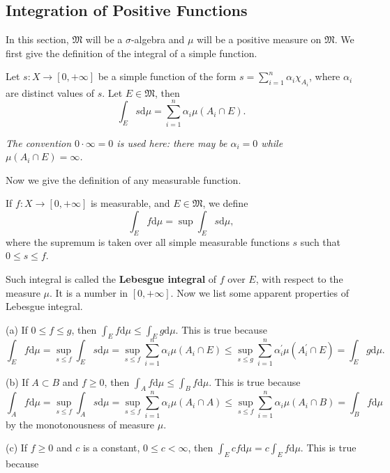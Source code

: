 \subsection{Integration of Positive Functions}
In this section, $\mathfrak{M}$ will be a $\sigma$-algebra and $\mu$ will be a positive measure on $\mathfrak{M}$. We first give the definition of the integral of a simple function.
\begin{definition}
Let $s:X\to[0,+\infty]$ be a simple function of the form $s=\sum_{i=1}^n\alpha_i\chi_{A_i}$, where $\alpha_i$ are distinct values of $s$. Let $E\in\mathfrak{M}$, then 
$$\int_Es\mathrm{d}\mu=\sum_{i=1}^n\alpha_i\mu(A_i\cap E).$$
\end{definition}
\begin{note}\em
The convention $0\cdot\infty=0$ is used here: there may be $\alpha_i=0$ while $\mu(A_i\cap E)=\infty$.
\end{note}
Now we give the definition of any measurable function.
\begin{definition}
If $f:X\to[0,+\infty]$ is measurable, and $E\in\mathfrak{M}$, we define 
$$\int_Ef\mathrm{d}\mu=\sup\int_Es\mathrm{d}\mu,$$
where the supremum is taken over all simple measurable functions $s$ such that $0\le s\le f$.
\end{definition}
Such integral is called the \textbf{Lebesgue integral} of $f$ over $E$, with respect to the measure $\mu$. It is a number in $[0,+\infty]$. Now we list some apparent properties of Lebesgue integral.\par
(a) If $0\le f\le g$, then $\int_Ef\mathrm{d}\mu\le\int_Eg\mathrm{d}\mu$. This is true because 
$$
\int_E{f\mathrm{d}\mu}=\mathop {\mathrm{sup}} \limits_{s\le f}\int_E{s\mathrm{d}\mu}=\mathop {\mathrm{sup}} \limits_{s\le f}\sum_{i=1}^n{\alpha _i\mu \left( A_i\cap E \right)}\le \mathop {\mathrm{sup}} \limits_{s\le g}\sum_{i=1}^n{\alpha _{i}^{\prime}\mu \left( A_{i}^{\prime}\cap E \right)}=\int_E{g\mathrm{d}\mu}.
$$\par
(b) If $A\subset B$ and $f\ge 0$, then $\int_Af\mathrm{d}\mu\le\int_Bf\mathrm{d}\mu$. This is true because 
$$
\int_A{f\mathrm{d}\mu}=\mathop {\mathrm{sup}} \limits_{s\le f}\int_A{s\mathrm{d}\mu}=\mathop {\mathrm{sup}} \limits_{s\le f}\sum_{i=1}^n{\alpha _i\mu \left( A_i\cap A \right)}\le \mathop {\mathrm{sup}} \limits_{s\le f}\sum_{i=1}^n{\alpha _i\mu \left( A_i\cap B \right)}=\int_B{f\mathrm{d}\mu}
$$
by the monotonousness of measure $\mu$.\par
(c) If $f\ge 0$ and $c$ is a constant, $0\le c<\infty$, then $\int_Ecf\mathrm{d}\mu=c\int_Ef\mathrm{d}\mu$. This is true because 
